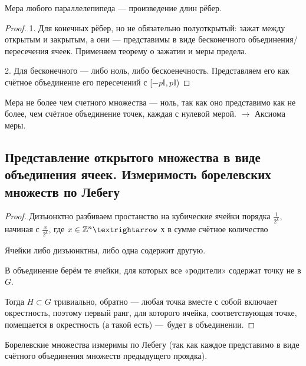 \documentclass[12pt, a4paper, oneside]{memoir}
\begin{document}
\begin{theorem}
    Мера любого параллелепипеда — произведение длин рёбер.

    \begin{proof}
        1. Для конечных рёбер, но не обязательно полуоткрытый: зажат между открытым и закрытым,
        а они — представимы в виде бесконечного объединения/пересечения ячеек. Применяем теорему о зажатии и меры предела.
        
        2. Для бесконечного — либо ноль, либо бескоенечность. Представляем его как счётное объединение его пересечений с [$-p \mathbb{I}, p \mathbb{I}$)
    \end{proof}
\end{theorem}

Мера не более чем счетного множества — ноль, так как оно представимо как не более, чем счётное объединение точек, каждая с нулевой мерой. $→$ Аксиома меры.


\subsection{Представление открытого множества в виде объединения ячеек.
Измеримость борелевских множеств по Лебегу}


\begin{theorem}

    \begin{proof}
        Дизъюнктно разбиваем простанство на кубические ячейки порядка $\frac{1}{2^k}$,
        начиная с $\frac{x}{2^k}$, где $x \in \sZ^n →$ х в сумме счётное количество
        
        Ячейки либо дизъюнктны, либо одна содержит другую.

        В объединение берём те ячейки, для которых все «родители» содержат точку не в $G$.

        Тогда $H \subset G$ тривиально, обратно — 
        любая точка вместе с собой включает окрестность, поэтому первый ранг,
        для которого ячейка, соответствующая точке, помещается в окрестность (а такой есть)
        — будет в объединении.
    \end{proof}
\end{theorem}

\begin{corollary}
    Борелевские множества измеримы по Лебегу
    (так как каждое представимо в виде счётного объединения множеств предыдущего проядка).
\end{corollary}
\end{document}
